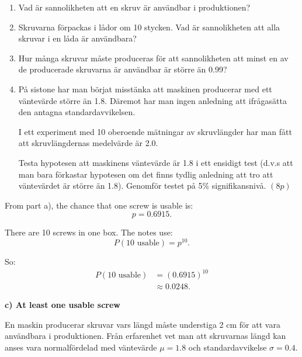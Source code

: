 \documentclass[10pt]{article}
\begin{document}
\begin{enumerate}[label=\alph*)]
\item Vad är sannolikheten att en skruv är användbar
i produktionen?

\item Skruvarna förpackas i lådor om 10 stycken.
Vad är sannolikheten att alla skruvar i en låda är
användbara?

\item Hur många skruvar måste produceras för att
sannolikheten att minst en av de producerade
skruvarna är användbar är större än 0.99?

\item På sistone har man börjat misstänka att
maskinen producerar med ett väntevärde större än
1.8. Däremot har man ingen anledning att ifrågasätta
den antagna standardavvikelsen.

I ett experiment med 10 oberoende mätningar av
skruvlängder har man fått att skruvlängdernas
medelvärde är 2.0.

Testa hypotesen att maskinens väntevärde är 1.8 i
ett ensidigt test (d.v.s att man bara förkastar
hypotesen om det finns tydlig anledning att tro att
väntevärdet är större än 1.8). Genomför testet på
5\% signifikansnivå. \((8p)\)
\end{enumerate}

From part a), the chance that one screw is usable is:
\[
p=0.6915.
\]

There are 10 screws in one box.
The notes use:
\[
P(\text{10 usable})
=p^{10}.
\]

So:
\begin{align*}
P(\text{10 usable})
&=
(0.6915)^{10}
\\[2mm]
&\approx
0.0248.
\end{align*}

\textbf{c) At least one usable screw}

En maskin producerar skruvar vars längd måste
understiga 2 cm för att vara användbara i
produktionen. Från erfarenhet vet man att skruvarnas
längd kan anses vara normalfördelad med väntevärde
\(\mu=1.8\) och standardavvikelse \(\sigma=0.4\).
\end{document}
